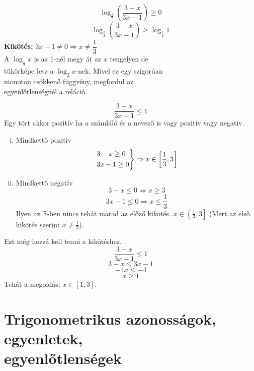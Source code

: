 \documentclass[12pt,a4paper,fleqn]{article}
\begin{document}
\begin{wrapfigure}[0]{R}{0pt}
\end{wrapfigure}
\[ \log_{\frac{1}{2}} \left( \dfrac{3-x}{3x-1} \right) \geq 0 \]
\[ \log_{\frac{1}{2}} \left( \dfrac{3-x}{3x-1} \right) \geq \log_{\frac{1}{2}} 1 \]
\textbf{Kikötés:} $ 3x -1 \neq 0 \Rightarrow x \neq \dfrac{1}{3} $ \\[2em]
A $\log_{\frac{1}{2}} x$ is az 1-nél megy át az $x$ tengelyen de \\
tükörképe lesz a $\log_2 x$-nek. Mivel ez egy szigorúan \\
monoton csökkenő függvény, megfordul az \\
egyenlőtlenségnél a reláció.

\[ \dfrac{3-x}{3x-1} \leq 1 \]
Egy tört akkor pozitív ha a számláló és a nevező is vagy pozitív vagy negatív.
\begin{enumerate}[i.]
  \item Mindkettő pozitív
  \[
  \begin{rcases*}
    3-x \geq 0 \\
    3x -1 \geq 0 \\
  \end{rcases*} \Rightarrow x \in \left[ \frac{1}{3}, 3 \right]
  \]
  \item Mindkettő negatív
  \[ 3-x \leq 0 \Rightarrow x \geq 3 \]
  \[ 3x -1 \leq 0 \Rightarrow x \leq \frac{1}{3} \]
  Ilyen az $\mathbb{R}$-ben nincs tehát marad az előző kikötés.
  $x \in \left( \frac{1}{3}, 3 \right]$ (Mert az első kikötés szerint
  $ x \neq \frac{1}{3}$).
\end{enumerate}
Ezt még hozzá kell tenni a kikötéshez.
\[ \dfrac{3-x}{3x-1} \leq 1 \]
\[ 3-x \leq 3x-1 \]
\[ -4x \leq -4 \]
\[ x \geq 1 \]
Tehát a megoldás: $x \in \left[ 1, 3 \right]$.

\clearpage
\section{Trigonometrikus azonosságok, egyenletek, \\ egyenlőtlenségek}
\setcounter{subsection}{1}
\end{document}
